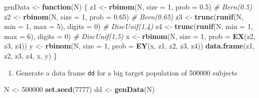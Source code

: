 \documentclass[
]{book}
\newenvironment{Shaded}{\begin{snugshade}}{\end{snugshade}}
\newcommand{\AttributeTok}[1]{\textcolor[rgb]{0.13,0.29,0.53}{#1}}
\newcommand{\CommentTok}[1]{\textcolor[rgb]{0.56,0.35,0.01}{\textit{#1}}}
\newcommand{\ControlFlowTok}[1]{\textcolor[rgb]{0.13,0.29,0.53}{\textbf{#1}}}
\newcommand{\DecValTok}[1]{\textcolor[rgb]{0.00,0.00,0.81}{#1}}
\newcommand{\FloatTok}[1]{\textcolor[rgb]{0.00,0.00,0.81}{#1}}
\newcommand{\FunctionTok}[1]{\textcolor[rgb]{0.13,0.29,0.53}{\textbf{#1}}}
\newcommand{\NormalTok}[1]{#1}
\newcommand{\OtherTok}[1]{\textcolor[rgb]{0.56,0.35,0.01}{#1}}
\providecommand{\tightlist}{%
  \setlength{\itemsep}{0pt}\setlength{\parskip}{0pt}}
\begin{document}
\begin{Shaded}
\begin{Highlighting}[]
\NormalTok{genData }\OtherTok{\textless{}{-}} \ControlFlowTok{function}\NormalTok{(N) \{}
\NormalTok{  z1 }\OtherTok{\textless{}{-}} \FunctionTok{rbinom}\NormalTok{(N, }\AttributeTok{size =} \DecValTok{1}\NormalTok{, }\AttributeTok{prob =} \FloatTok{0.5}\NormalTok{) }\CommentTok{\# Bern(0.5)}
\NormalTok{  z2 }\OtherTok{\textless{}{-}} \FunctionTok{rbinom}\NormalTok{(N, }\AttributeTok{size =} \DecValTok{1}\NormalTok{, }\AttributeTok{prob =} \FloatTok{0.65}\NormalTok{) }\CommentTok{\# Bern(0.65)}
\NormalTok{  z3 }\OtherTok{\textless{}{-}} \FunctionTok{trunc}\NormalTok{(}\FunctionTok{runif}\NormalTok{(N, }\AttributeTok{min =} \DecValTok{1}\NormalTok{, }\AttributeTok{max =} \DecValTok{5}\NormalTok{), }\AttributeTok{digits =} \DecValTok{0}\NormalTok{) }\CommentTok{\# DiscUnif(1,4)}
\NormalTok{  z4 }\OtherTok{\textless{}{-}} \FunctionTok{trunc}\NormalTok{(}\FunctionTok{runif}\NormalTok{(N, }\AttributeTok{min =} \DecValTok{1}\NormalTok{, }\AttributeTok{max =} \DecValTok{6}\NormalTok{), }\AttributeTok{digits =} \DecValTok{0}\NormalTok{) }\CommentTok{\# DiscUnif(1,5)}
\NormalTok{  x }\OtherTok{\textless{}{-}} \FunctionTok{rbinom}\NormalTok{(N, }\AttributeTok{size =} \DecValTok{1}\NormalTok{, }\AttributeTok{prob =} \FunctionTok{EX}\NormalTok{(z2, z3, z4))}
\NormalTok{  y }\OtherTok{\textless{}{-}} \FunctionTok{rbinom}\NormalTok{(N, }\AttributeTok{size =} \DecValTok{1}\NormalTok{, }\AttributeTok{prob =} \FunctionTok{EY}\NormalTok{(x, z1, z2, z3, z4))}
  \FunctionTok{data.frame}\NormalTok{(z1, z2, z3, z4, x, y)}
\NormalTok{\}}
\end{Highlighting}
\end{Shaded}

\begin{enumerate}
\def\labelenumi{\arabic{enumi}.}
\setcounter{enumi}{3}
\tightlist
\item
  Generate a data frame \texttt{dd} for a big target population of
  500000 subjects
\end{enumerate}

\begin{Shaded}
\begin{Highlighting}[]
\NormalTok{N }\OtherTok{\textless{}{-}} \DecValTok{500000}
\FunctionTok{set.seed}\NormalTok{(}\DecValTok{7777}\NormalTok{)}
\NormalTok{dd }\OtherTok{\textless{}{-}} \FunctionTok{genData}\NormalTok{(N)}
\end{Highlighting}
\end{Shaded}
\end{document}
